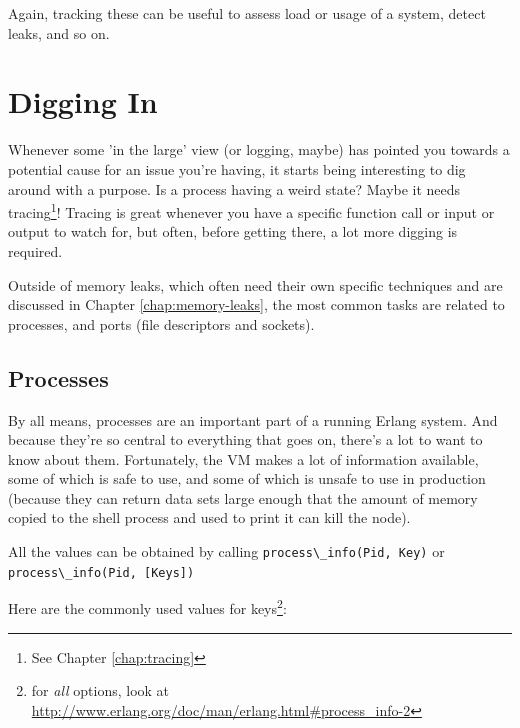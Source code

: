 \documentclass[11pt, oneside]{book}   	%
\newcommand{\expression}[1]{\Verb`#1`}
\begin{document}
Again, tracking these can be useful to assess load or usage of a system, detect leaks, and so on.

\section{Digging In}
\label{sec:digging-in}

Whenever some 'in the large' view (or logging, maybe) has pointed you towards a potential cause for an issue you're having, it starts being interesting to dig around with a purpose. Is a process having a weird state? Maybe it needs tracing\footnote{See Chapter \ref{chap:tracing}}! Tracing is great whenever you have a specific function call or input or output to watch for, but often, before getting there, a lot more digging is required.

Outside of memory leaks, which often need their own specific techniques and are discussed in Chapter \ref{chap:memory-leaks}, the most common tasks are related to processes, and ports (file descriptors and sockets).

\subsection{Processes}
\label{subsec:digging-procs}

By all means, processes are an important part of a running Erlang system. And because they're so central to everything that goes on, there's a lot to want to know about them. Fortunately, the VM makes a lot of information available, some of which is safe to use, and some of which is unsafe to use in production (because they can return data sets large enough that the amount of memory copied to the shell process and used to print it can kill the node).

All the values can be obtained by calling \expression{process\_info(Pid, Key)} or \expression{process\_info(Pid, [Keys])}

Here are the commonly used values for keys\footnote{for \emph{all} options, look at \href{http://www.erlang.org/doc/man/erlang.html\#process\_info-2}{http://www.erlang.org/doc/man/erlang.html\#process\_info-2}}:
\end{document}
